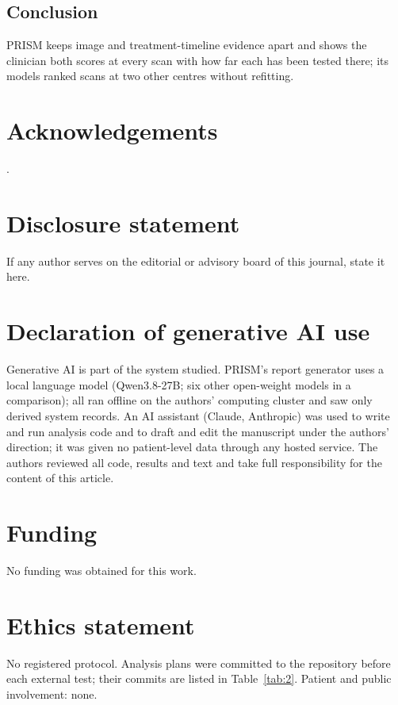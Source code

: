 \documentclass[largeformat]{interact} %
\begin{document}
\subsection*{Conclusion}

PRISM keeps image and treatment-timeline evidence apart and shows the clinician both scores at every scan with how
far each has been tested there; its models ranked scans at two other centres without refitting.

\section*{Acknowledgements}
.

\section*{Disclosure statement}
 If any author serves on the editorial or advisory board of this journal, state it here.

\section*{Declaration of generative AI use}
 Generative AI is part of the system studied. PRISM's report generator uses
a local language model (Qwen3.8-27B; six other open-weight models in a comparison); all ran offline on the authors'
computing cluster and saw only derived system records. An AI assistant (Claude, Anthropic) was used to write and run
analysis code and to draft and edit the manuscript under the authors' direction; it was given no patient-level
data through any hosted service. The authors reviewed all code, results and text and take full responsibility for
the content of this article.

\section*{Funding}
No funding was obtained for this work.

\section*{Ethics statement}
 No registered protocol. Analysis plans were committed to the repository before each external
test; their commits are listed in Table~\ref{tab:2}. Patient and public involvement: none.
\end{document}
